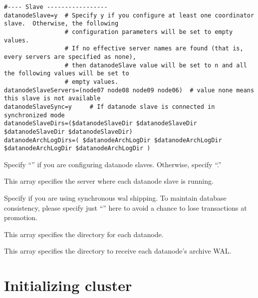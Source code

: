   
  \begin{lstlisting}[frame=single, basicstyle=\ttfamily\tiny]
#---- Slave -----------------
datanodeSlave=y  # Specify y if you configure at least one coordinator slave.  Otherwise, the following
                 # configuration parameters will be set to empty values.
                 # If no effective server names are found (that is, every servers are specified as none),
                 # then datanodeSlave value will be set to n and all the following values will be set to
                 # empty values.
datanodeSlaveServers=(node07 node08 node09 node06)  # value none means this slave is not available
datanodeSlaveSync=y     # If datanode slave is connected in synchronized mode
datanodeSlaveDirs=($datanodeSlaveDir $datanodeSlaveDir $datanodeSlaveDir $datanodeSlaveDir)
datanodeArchLogDirs=( $datanodeArchLogDir $datanodeArchLogDir $datanodeArchLogDir $datanodeArchLogDir )
  \end{lstlisting}
  
  
	  Specify ``'' if you are configuring datanode slaves.
	  Otherwise, specify ``.''
  
  
	  This array specifies the server where each datanode slave is running.
  
  
	  Specify if you are using synchronous wal shipping.
	  To maintain database consistency, please specify just ``'' here to avoid a chance to lose transactions at promotion.
  
  
	  This array specifies the directory for each datanode.
  
  
	  This array specifies the directory to receive each datanode's archive WAL.




%
%
\chapter{Initializing \XC{} cluster}

